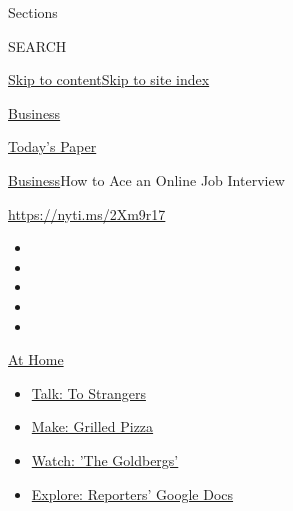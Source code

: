 Sections

SEARCH

\protect\hyperlink{site-content}{Skip to
content}\protect\hyperlink{site-index}{Skip to site index}

\href{https://www.nytimes3xbfgragh.onion/section/business}{Business}

\href{https://myaccount.nytimes3xbfgragh.onion/auth/login?response_type=cookie\&client_id=vi}{}

\href{https://www.nytimes3xbfgragh.onion/section/todayspaper}{Today's
Paper}

\href{/section/business}{Business}\textbar{}How to Ace an Online Job
Interview

\href{https://nyti.ms/2Xm9r17}{https://nyti.ms/2Xm9r17}

\begin{itemize}
\item
\item
\item
\item
\item
\end{itemize}

\href{https://www.nytimes3xbfgragh.onion/spotlight/at-home?action=click\&pgtype=Article\&state=default\&region=TOP_BANNER\&context=at_home_menu}{At
Home}

\begin{itemize}
\tightlist
\item
  \href{https://www.nytimes3xbfgragh.onion/2020/08/03/well/family/the-benefits-of-talking-to-strangers.html?action=click\&pgtype=Article\&state=default\&region=TOP_BANNER\&context=at_home_menu}{Talk:
  To Strangers}
\item
  \href{https://www.nytimes3xbfgragh.onion/2020/08/01/at-home/coronavirus-make-pizza-on-a-grill.html?action=click\&pgtype=Article\&state=default\&region=TOP_BANNER\&context=at_home_menu}{Make:
  Grilled Pizza}
\item
  \href{https://www.nytimes3xbfgragh.onion/2020/07/31/arts/television/goldbergs-abc-stream.html?action=click\&pgtype=Article\&state=default\&region=TOP_BANNER\&context=at_home_menu}{Watch:
  'The Goldbergs'}
\item
  \href{https://www.nytimes3xbfgragh.onion/interactive/2020/at-home/even-more-reporters-editors-diaries-lists-recommendations.html?action=click\&pgtype=Article\&state=default\&region=TOP_BANNER\&context=at_home_menu}{Explore:
  Reporters' Google Docs}
\end{itemize}

